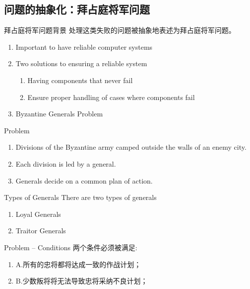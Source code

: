 \documentclass[11pt]{beamer}
\begin{document}
\subsection{问题的抽象化：拜占庭将军问题}

\begin{frame}{拜占庭将军问题背景}
	处理这类失败的问题被抽象地表述为拜占庭将军问题\cite{lamport_byzantine_1982}。
	\begin{enumerate}
\item Important to have reliable computer systems
\item  Two solutions to ensuring a reliable system
\begin{enumerate}
\item Having components that never fail
\item Ensure proper handling of cases where components fail
\end{enumerate}
\item Byzantine Generals Problem
	\end{enumerate}
\end{frame}

\begin{frame}{Problem}
\begin{enumerate}
	\item Divisions of the Byzantine army camped outside the walls of an enemy city.
\item  Each division is led by a general.
\item Generals decide on a common plan of action.
\end{enumerate}
\end{frame}

\begin{frame}{Types of Generals}
		There are two types of generals
	\begin{enumerate}
		\item Loyal Generals
		\item Traitor Generals
	\end{enumerate}
\end{frame}

\begin{frame}{Problem – Conditions}
两个条件必须被满足:
\begin{enumerate}
	\item A.所有的忠将都将达成一致的作战计划；
	\item B.少数叛将将无法导致忠将采纳不良计划； 
\end{enumerate}
	\end{frame}
\end{document}
